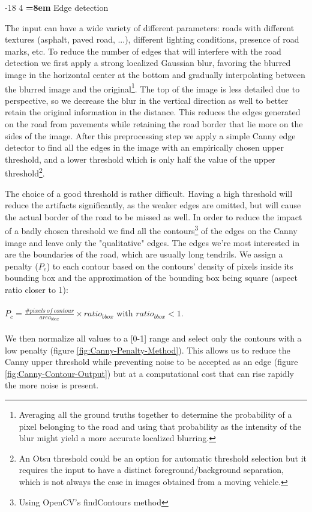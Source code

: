 \documentclass[oneside,english]{llncs}
\makeatletter
\renewcommand\subsubsection{\@startsection{subsubsection}{3}{\z@}%
                       {-18\p@ \@plus -4\p@ \@minus -4\p@}%
                       {4\p@ \@plus 2\p@ \@minus 2\p@}%
                       {\normalfont\normalsize\bfseries\boldmath
                        \rightskip=\z@ \@plus 8em\pretolerance=10000 }}
\makeatother
\begin{document}
\subsubsection{Edge detection}

The input can have a wide variety of different parameters: roads with different textures (asphalt, paved road, ...), different lighting conditions, presence of road marks, etc. To reduce the number of edges that will interfere with the road detection we first apply a strong localized Gaussian blur, favoring the blurred image in the horizontal center at the bottom and gradually interpolating between the blurred image and the original\footnote{Averaging all the ground truths together to determine the probability of a pixel belonging to the road and using that probability as the intensity of the blur might yield a more accurate localized blurring.}.
The top of the image is less detailed due to perspective, so we decrease the blur in the vertical direction as well to better retain the original information in the distance. This reduces the edges generated on the road from pavements while retaining the road border that lie more on the sides of the image. 
After this preprocessing step we apply a simple Canny edge detector to find all the edges in the image with an empirically chosen upper threshold, and a lower threshold which is only half the value of the upper threshold\footnote{An Otsu threshold could be an option for automatic threshold selection \cite{key-1} but it requires the input to have a distinct foreground/background separation, which is not always the case in images obtained from a moving vehicle.}.

The choice of a good threshold is rather difficult. Having a high threshold will reduce the artifacts significantly, as the weaker edges are omitted, but will cause the actual border of the road to be missed as well. In order to reduce the impact of a badly chosen threshold we find all the contours\footnote{Using OpenCV's findContours method} of the edges on the Canny image and leave only the "qualitative" edges. The edges we're most interested in are the boundaries of the road, which are usually long tendrils. We assign a penalty ($P_{c}$) to each contour based on the contours' density of pixels inside its bounding box and the approximation of the bounding box being square (aspect ratio closer to 1):\\
\\
$P_{c} = \frac{\#pixels\:of\:contour}{area_{bbox}} \times ratio_{bbox}$ with $ratio_{bbox} < 1$.\\
\\We then normalize all values to a [0-1] range and select only the contours with a low penalty (figure \ref{fig:Canny-Penalty-Method}). This allows us to reduce the Canny upper threshold while preventing noise to be accepted as an edge (figure \ref{fig:Canny-Contour-Output}) but at a computational cost that can rise rapidly the more noise is present.
\end{document}
